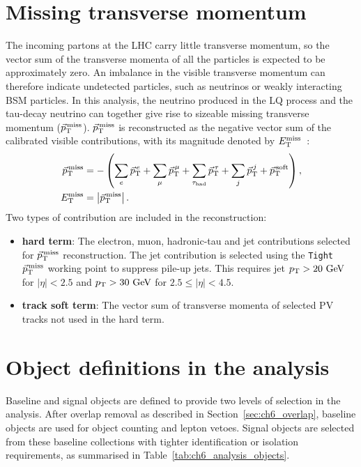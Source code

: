 \section{Missing transverse momentum}
\label{sec:ch6_met}

The incoming partons at the LHC carry little transverse momentum, so the vector sum of the transverse momenta of all the particles is expected to be approximately zero.
An imbalance in the visible transverse momentum can therefore indicate undetected particles, such as neutrinos or weakly interacting BSM particles.
In this analysis, the neutrino produced in the LQ process and the tau-decay neutrino can together give rise to sizeable missing transverse momentum ($\vec p_{\mathrm{T}}^{\,\mathrm{miss}}$).
$\vec p_{\mathrm{T}}^{\,\mathrm{miss}}$ is reconstructed as the negative vector sum of the calibrated visible contributions, with its magnitude denoted by $E_{\mathrm{T}}^{\mathrm{miss}}$~\cite{ATLAS2025METPerformance}:
\begin{align}
    \vec p_{\mathrm{T}}^{\,\mathrm{miss}}
    &=-\left(
    \sum_e\vec p_{\mathrm{T}}^{\,e}
    +\sum_\mu\vec p_{\mathrm{T}}^{\,\mu}
    +\sum_{\tau_{\mathrm{had}}}\vec p_{\mathrm{T}}^{\,\tau}
    +\sum_j\vec p_{\mathrm{T}}^{\,j}
    +\vec p_{\mathrm{T}}^{\,\mathrm{soft}}
    \right),
    \label{eq:ch6_met_vector}\\
    E_{\mathrm{T}}^{\mathrm{miss}}&=\left|\vec p_{\mathrm{T}}^{\,\mathrm{miss}}\right|.
    \label{eq:ch6_met_magnitude}
\end{align}
Two types of contribution are included in the reconstruction:
\begin{itemize}
    \item \textbf{hard term}: The electron, muon, hadronic-tau and jet contributions selected for $\vec p_{\mathrm{T}}^{\,\mathrm{miss}}$ reconstruction.
    The jet contribution is selected using the \texttt{Tight} $\vec p_{\mathrm{T}}^{\,\mathrm{miss}}$ working point to suppress pile-up jets.
    This requires jet $p_{\mathrm{T}}>20~\mathrm{GeV}$ for $|\eta|<2.5$ and $p_{\mathrm{T}}>30~\mathrm{GeV}$ for $2.5\leq|\eta|<4.5$.
    \item \textbf{track soft term}: The vector sum of transverse momenta of selected PV tracks not used in the hard term.
\end{itemize}

\section{Object definitions in the analysis}
\label{sec:ch6_analysis_objects}

Baseline and signal objects are defined to provide two levels of selection in the analysis.
After overlap removal as described in Section~\ref{sec:ch6_overlap}, baseline objects are used for object counting and lepton vetoes.
Signal objects are selected from these baseline collections with tighter identification or isolation requirements, as summarised in Table~\ref{tab:ch6_analysis_objects}.

